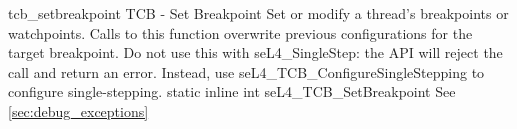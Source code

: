 %
%
%
%

\apidoc
{tcb_setbreakpoint}
{TCB - Set Breakpoint}
{Set or modify a thread's breakpoints or watchpoints. Calls to this function
overwrite previous configurations for the target breakpoint. Do not use this
with seL4\_SingleStep: the API will reject the call and return an error.
Instead, use seL4\_TCB\_ConfigureSingleStepping to configure single-stepping.}
{static inline int seL4\_TCB\_SetBreakpoint}
{
}
{\errorenumdesc}
{See \autoref{sec:debug_exceptions}}
